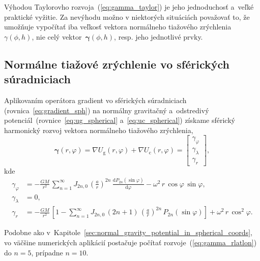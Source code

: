 \documentclass[a4paper,12pt]{book}
\newcommand{\diff}{\mathrm d}
\newcommand{\gidx}{\mathrm g}
\newcommand{\cidx}{\mathrm c}
\begin{document}
Výhodou Taylorovho rozvoja~(\ref{eq:gamma_taylor}) je jeho jednoduchosť a~veľké 
praktické vyžitie.  Za nevýhodu možno v niektorých situáciách považovať to, že 
umožňuje vypočítať iba veľkosť vektora normálneho tiažového zrýchlenia 
$\gamma(\phi, h)$, nie celý vektor~$\boldsymbol \gamma(\phi, h)$, resp. jeho 
jednotlivé prvky.







\subsection{Normálne tiažové zrýchlenie vo sférických súradniciach}
\label{sec:normal_gravity_in_sph_coords}

Aplikovaním operátora gradient vo sférických súradniciach 
(rovnica~\ref{eq:gradient_sph}) na normálny gravitačný a~odstredivý 
potenciál~(rovnice~\ref{eq:ug_spherical} a~\ref{eq:uc_spherical}) získame 
sférický harmonický rozvoj vektora normálneho tiažového zrýchlenia,
%
\begin{equation}
\boldsymbol \gamma(r, \varphi) = \nabla U_\gidx(r, \varphi) + \nabla U_\cidx(r, 
\varphi) =
%
\begin{bmatrix}
\gamma_\varphi\\
\gamma_\lambda\\
\gamma_r
\end{bmatrix}
%
{,}
\end{equation}
%
kde
%
\begin{equation}
\label{eq:gamma_rlatlon}
\begin{split}
\gamma_\varphi &= -\frac{GM}{r^2} \, \sum_{n = 1}^\infty J_{2n,0} \, \left( 
\frac{a}{r} \right)^{2n} \, \frac{\diff P_{2n}(\sin\varphi)}{\diff \varphi} 
-\omega^2 \, r \, \cos\varphi \, \sin\varphi{,}\\
\gamma_\lambda &= 0{,}\\
\gamma_r &= -\frac{GM}{r^2} \, \left[ 1 - \sum_{n = 1}^{\infty} J_{2n,0} \, (2n 
+ 1) \, \left( \frac{a}{r} \right)^{2n} \, P_{2n}(\sin\varphi) \right] 
+ \omega^2 \, r \, \cos^2\varphi{.}
\end{split}
\end{equation}

Podobne ako v~Kapitole~\ref{sec:normal_gravity_potential_in_spherical_coords}, 
vo väčšine numerických aplikácií postačuje počítať 
rozvoje~(\ref{eq:gamma_rlatlon}) do $n = 5$, prípadne $n = 10$.
\end{document}
